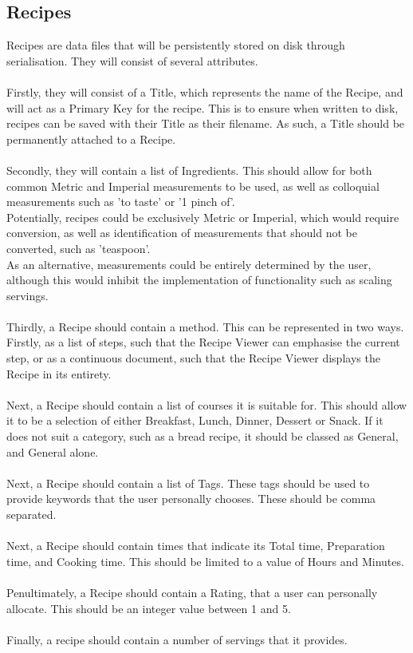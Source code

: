 \documentclass[a4paper, 12pt]{article}
\begin{document}
\subsection{Recipes}
Recipes are data files that will be persistently stored on disk through serialisation. They will consist of several attributes.\\\\
Firstly, they will consist of a Title, which represents the name of the Recipe, and will act as a Primary Key for the recipe. This is to ensure when written to disk, recipes can be saved with their Title as their filename. As such, a Title should be permanently attached to a Recipe.\\\\
Secondly, they will contain a list of Ingredients. This should allow for both common Metric and Imperial measurements to be used, as well as colloquial measurements such as 'to taste' or '1 pinch of'.\\
Potentially, recipes could be exclusively Metric or Imperial, which would require conversion, as well as identification of measurements that should not be converted, such as 'teaspoon'.\\
As an alternative, measurements could be entirely determined by the user, although this would inhibit the implementation of functionality such as scaling servings.\\\\
Thirdly, a Recipe should contain a method. This can be represented in two ways. Firstly, as a list of steps, such that the Recipe Viewer can emphasise the current step, or as a continuous document, such that the Recipe Viewer displays the Recipe in its entirety.\\\\
Next, a Recipe should contain a list of courses it is suitable for. This should allow it to be a selection of either Breakfast, Lunch, Dinner, Dessert or Snack. If it does not suit a category, such as a bread recipe, it should be classed as General, and General alone.\\\\
Next, a Recipe should contain a list of Tags. These tags should be used to provide keywords that the user personally chooses. These should be comma separated.\\\\
Next, a Recipe should contain times that indicate its Total time, Preparation time, and Cooking time. This should be limited to a value of Hours and Minutes.\\\\
Penultimately, a Recipe should contain a Rating, that a user can personally allocate. This should be an integer value between 1 and 5.\\\\
Finally, a recipe should contain a number of servings that it provides.
\end{document}
